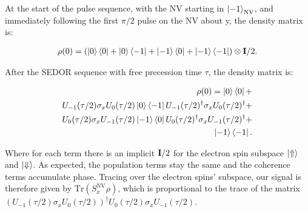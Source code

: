 \documentclass[%
 reprint,
 amsmath,amssymb,
 aps,
]{revtex4-1}
\begin{document}
At the start of the pulse sequence, with the NV starting in $\ket{-1}_{\text{NV}}$, and immediately following the first $\pi/2$ pulse on the NV about y, the density matrix is:

\begin{align}
\rho(0) = (\ket{0}\bra{0} + \ket{0}\bra{-1} + \ket{-1}\bra{0}+ \ket{-1}\bra{-1})\otimes {\bf{I}}/2.
\end{align}

After the SEDOR sequence with free precession time $\tau$, the density matrix is: 

\begin{align}
\rho(0) = \ket{0}\bra{0} +  \\ U_{-1}(\tau/2)\sigma_x U_0(\tau/2)\ket{0}\bra{-1}U_{-1}(\tau/2)^{\dagger} \sigma_x  U_0(\tau/2)^{\dagger} + \\ U_{0}(\tau/2) \sigma_x U_{-1}(\tau/2)\ket{-1}\bra{0}U_0(\tau/2)^{\dagger} \sigma_x U_{-1}(\tau/2)^{\dagger}  + \\ \ket{-1}\bra{-1}.
\end{align}

Where for each term there is an implicit ${\bf{I}}/2$ for the electron spin subspace $\ket{\Uparrow}$ and $\ket{\Downarrow}$. As expected, the population terms stay the same and the coherence terms accumulate phase. Tracing over the electron spins' subspace, our signal is therefore given by $\text{Tr}(S_{x}^{\text{NV}}\rho)$, which is proportional to the trace of the matrix $(U_{-1}(\tau/2) \sigma_{x} U_{0}(\tau/2))^{\dagger} U_{0}(\tau/2) \sigma_{x} U_{-1}(\tau/2)$.
\end{document}
